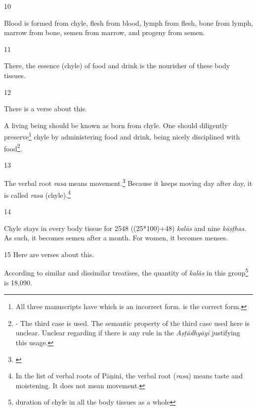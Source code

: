 \begin{translation}
\item [10]

\begin{sloka}
Blood is formed from chyle, flesh from blood, lymph from flesh, bone from lymph, marrow from bone, semen from marrow, and progeny from semen. 
\end{sloka}

\item [11]

There, the essence (chyle) of food and drink is the nourisher of these body tissues.


\item[12]

There is a verse about this.

\begin{sloka}
A living being should be known as born from chyle. One should diligently preserve\footnote{All three manuscripts have  which is an incorrect form.  is the correct form.} chyle by administering food and drink, being nicely disciplined with food\footnote{ - The third case is used. The semantic property of the third case used here is unclear. Unclear regarding if there is any rule in the \emph{Aṣṭādhyāyī} justifying this usage.}.
\end{sloka}

\item[13]

The verbal root \emph{rasa} means movement.\footnote{\cite[109]{kunj-1907}} Because it keeps moving day after day, it is called \emph{rasa} (chyle).\footnote{In the list of verbal roots of Pāṇini, the verbal root (\emph{rasa}) means taste and moistening. It does not mean movement.}    

\item[14]

Chyle stays in every body tissue for 2548 ((25*100)+48) \emph{kalās} and nine \emph{kāṣṭhas}. As such, it becomes semen after a month. For women, it becomes menses.  

\item[15] 
Here are verses about this.

\begin{sloka}
According to similar and dissimilar treatises, the quantity of \emph{kalās} in this group\footnote{duration of chyle in all the body tissues as a whole} is 18,090.



\end{sloka}
\end{translation}
